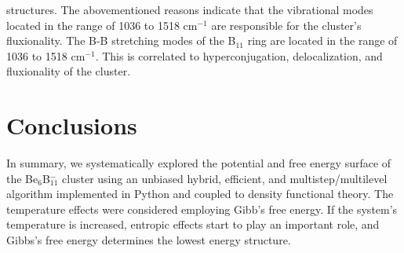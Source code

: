 \documentclass[prb,aps,preprint,showkeys,showpacs]{revtex4}
\begin{document}
structures. The abovementioned reasons indicate that the vibrational modes located in the range of 1036 to 1518 cm$^{-1}$ are responsible for the cluster's fluxionality. The B-B stretching modes of the B$_{11}$ ring are located in the range of 1036 to 1518 cm$^{-1}$. This is correlated to hyperconjugation, delocalization, and fluxionality of the cluster.

\section{Conclusions}
In summary, we systematically explored the potential and free energy surface of the Be$_6$B$_{11}^{-}$ cluster using an unbiased hybrid, efficient, and multistep/multilevel algorithm implemented in Python and coupled to density functional theory. The temperature effects were considered employing Gibb’s free energy. If the system’s temperature is increased, entropic effects start to play an important role, and Gibbs’s free energy determines the lowest energy structure. 
\end{document}
